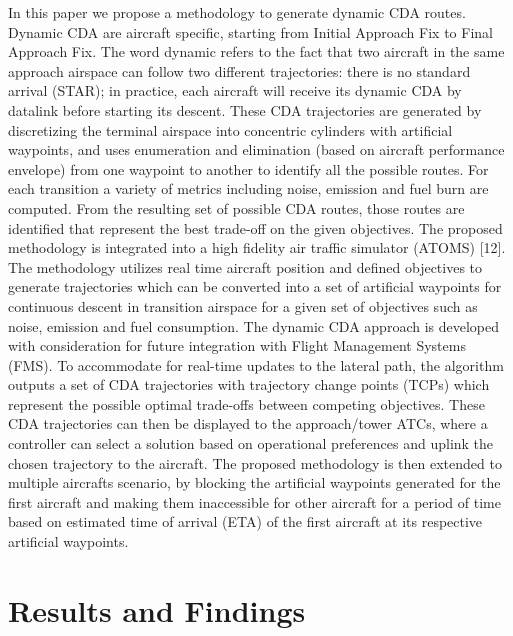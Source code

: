 \documentclass{aer1315-pretty}
\begin{document}
\begin{itemize}
      In this paper we propose a methodology to
generate dynamic CDA routes. Dynamic CDA are
aircraft specific, starting from Initial Approach Fix to
Final Approach Fix. The word dynamic refers to the
fact that two aircraft in the same approach airspace can
follow two different trajectories: there is no standard
arrival (STAR); in practice, each aircraft will receive
its dynamic CDA by datalink before starting its
descent. These CDA trajectories are generated by
discretizing the terminal airspace into concentric
cylinders with artificial waypoints, and uses
enumeration and elimination (based on aircraft
performance envelope) from one waypoint to another
to identify all the possible routes. For each transition a
variety of metrics including noise, emission and fuel
burn are computed. From the resulting set of possible
CDA routes, those routes are identified that represent
the best trade-off on the given objectives.
      The proposed methodology is integrated into a
high fidelity air traffic simulator (ATOMS) [12]. The
methodology utilizes real time aircraft position and
defined objectives to generate trajectories which can
be converted into a set of artificial waypoints for
continuous descent in transition airspace for a given
set of objectives such as noise, emission and fuel
consumption.
      The dynamic CDA approach is developed with
consideration for future integration with Flight
Management Systems (FMS). To accommodate for
real-time updates to the lateral path, the algorithm
outputs a set of CDA trajectories with trajectory
change points (TCPs) which represent the possible
optimal trade-offs between competing objectives.
These CDA trajectories can then be displayed to the
approach/tower ATCs, where a controller can select a
solution based on operational preferences and uplink
the chosen trajectory to the aircraft.
      The proposed methodology is then extended to
multiple aircrafts scenario, by blocking the artificial
waypoints generated for the first aircraft and making
them inaccessible for other aircraft for a period of time
based on estimated time of arrival (ETA) of the first
aircraft at its respective artificial waypoints.



\end{itemize}





\section{Results and Findings} \label{sec:results}
\end{document}
